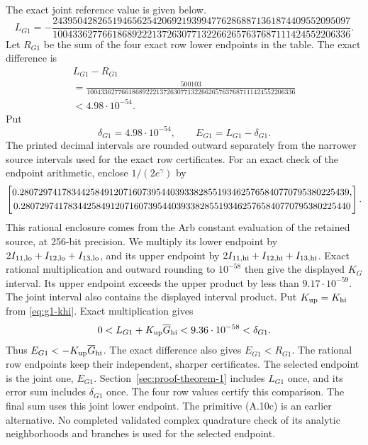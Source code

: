 {The exact joint reference value is given below.
{\normalsize
\[
 L_{G1}=-\frac{243950428265194656254206921939947762868871361874409552095097}
 {100433627766186892221372630771322662657637687111424552206336}.
                                                               \tag{A.10}
\]
}
Let $R_{G1}$ be the sum of the four exact row lower endpoints in the
table. The exact difference is
{\normalsize
\[
\begin{gathered}
 L_{G1}-R_{G1}\\
 =\frac{500103}
 {100433627766186892221372630771322662657637687111424552206336}\\
 <4.98\cdot10^{-54}.
\end{gathered}
\]
}
Put
\[
 \delta_{G1}=4.98\cdot10^{-54},\qquad
 E_{G1}=L_{G1}-\delta_{G1}.
\]
The printed decimal intervals are rounded outward separately from the
narrower source intervals used for the exact row certificates.
For an exact check of the endpoint arithmetic, enclose $1/(2e^\gamma)$ by
{\small
\[
\left[\begin{gathered}{}0.2807297417834425849120716073954403933828551934625765840770795380225439,\\{}0.2807297417834425849120716073954403933828551934625765840770795380225440\end{gathered}\right].
\]
}
This rational enclosure comes from the Arb constant evaluation of
the retained source, at 256-bit precision.
We multiply its lower endpoint by $2I_{11,\rm lo}+I_{12,\rm lo}+I_{13,\rm lo}$,
and its upper endpoint by $2I_{11,\rm hi}+I_{12,\rm hi}+I_{13,\rm hi}$.
Exact rational multiplication and outward rounding to $10^{-58}$ then give
the displayed $K_G$ interval.
Its upper endpoint exceeds the upper product by less than
$9.17\cdot10^{-59}$.
The joint interval also contains the displayed interval product.
Put $K_{\rm up}=K_{\rm hi}$ from \eqref{eq:g1-khi}.
Exact multiplication gives
\[
 0<L_{G1}+K_{\rm up}\overline G_{\rm hi}
 <9.36\cdot10^{-58}<\delta_{G1}.
\]
Thus $E_{G1}<-K_{\rm up}\overline G_{\rm hi}$. The exact difference
also gives $E_{G1}<R_{G1}$.
The rational row endpoints keep their independent, sharper certificates.
The selected endpoint is the joint one, $E_{G1}$.
Section~\ref{sec:proof-theorem-1} includes $L_{G1}$ once,
and its error sum includes $\delta_{G1}$ once.
The four row values certify this comparison.
The final sum uses this joint lower endpoint.
The primitive (A.10c) is an earlier alternative.
No completed validated complex quadrature check of its analytic
neighborhoods and branches is used for the selected endpoint.

}
